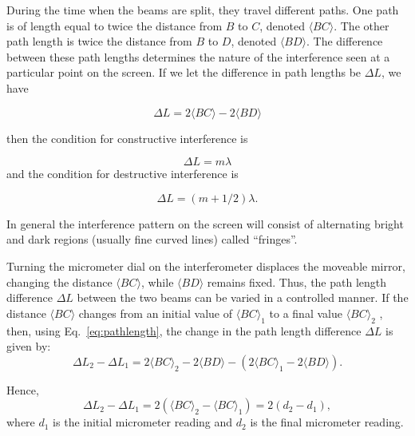 \documentclass{tufte-handout}
\begin{document}
During the time when the beams are split, they travel different 
paths. One path is of length equal to twice the distance from 
$B$ to $C$, denoted $\langle BC\rangle$. The other path length is twice 
the distance from $B$ to $D$, denoted $\langle BD\rangle$. The difference 
between these path lengths determines the nature of the interference 
seen at a particular point on the screen. If we let the difference in path lengths be $\Delta L$, we have

\begin{equation}
\Delta L = 2\langle BC\rangle - 2\langle BD\rangle 
\label{eq:pathlength}
\end{equation}

then the condition for constructive interference is 

\begin{equation}
 \Delta L = m\lambda
\label{eq:constructive}
\end{equation}
and the condition for destructive interference is

\begin{equation}
\Delta L = (m+1/2)\lambda.
\label{eq:destructive}
\end{equation}

In general the interference pattern on the screen will consist of alternating
bright and dark regions (usually fine curved lines) called
``fringes''.

Turning the micrometer dial on the interferometer displaces the moveable mirror,
changing the distance $\langle BC \rangle$, while $\langle BD\rangle $ remains
fixed. Thus, the path length difference $\Delta L$ between the two beams can be varied
in a controlled manner. If the distance $\langle BC\rangle$ changes from an
initial value of $\langle BC\rangle_{1}$ to a final value $\langle
BC\rangle_{2}$ , then, using Eq.~\ref{eq:pathlength}, the change in the path
length difference $\Delta L$ is given by:
\begin{equation}
 \Delta L_2 - \Delta L_{1} = 2\langle BC\rangle_{2} - 2\langle BD\rangle - (2\langle
 BC\rangle_{1} - 2\langle BD\rangle).
\label{eq:deltapathlength}
\end{equation}

\noindent Hence,
\begin{equation}
\Delta L_{2} - \Delta L_{1} = 2(\langle BC\rangle_{2}  - \langle BC\rangle_{1}) = 2(d_{2} -
d_{1}),
\end{equation}
\noindent where $d_{1}$ is the initial micrometer reading and $d_{2}$ is the
final micrometer reading. 
\end{document}
